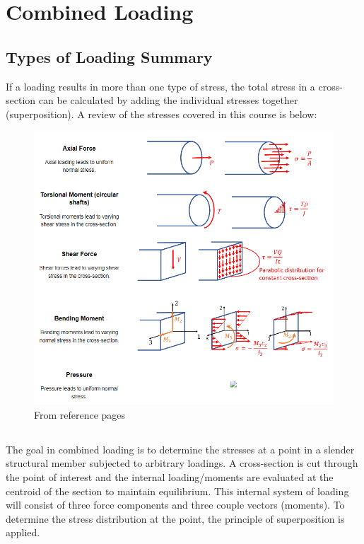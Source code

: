 \section{Combined Loading}

\subsection{Types of Loading Summary}

If a loading results in more than one type of stress, the total stress in a cross-section can be calculated by adding the individual stresses together (superposition). A review of the stresses covered in this course is below:

\begin{figure}[!h]
\centering
\includegraphics[angle=0, width=6in]{Combined Loading-Figures/LoadTypes.png}
\vspace{-2mm}
\caption{\small From reference pages}
\vspace{-3mm}
\label{Fig:LoadTypes}
\end{figure}

\subsection{}

The goal in combined loading is to determine the stresses at a point in a slender structural member subjected to arbitrary loadings. A cross-section is cut through the point of interest and the internal loading/moments are evaluated at the centroid of the section to maintain equilibrium. This internal system of loading will consist of three force components and three couple vectors (moments). To determine the stress distribution at the point, the principle of superposition is applied.

